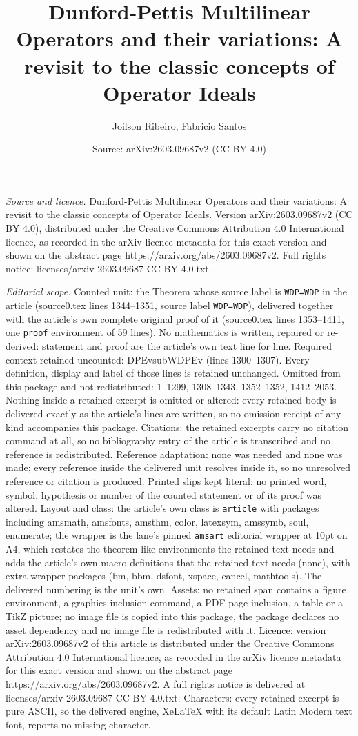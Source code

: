 \documentclass[10pt,a4paper]{amsart}
\title[Dunford-Pettis Multilinear Operators and their variations: A]{Dunford-Pettis Multilinear Operators and their variations: A revisit to the classic concepts of Operator Ideals}
\author{Joilson Ribeiro, Fabricio Santos}
\date{Source: arXiv:2603.09687v2 (CC BY 4.0)}
\begin{document}
\maketitle

\noindent\emph{Source and licence.} Dunford-Pettis Multilinear Operators and their variations: A revisit to the classic concepts of Operator Ideals. Version arXiv:2603.09687v2 (CC BY 4.0), distributed under the Creative Commons Attribution 4.0 International licence, as recorded in the arXiv licence metadata for this exact version and shown on the abstract page https://arxiv.org/abs/2603.09687v2. Full rights notice: licenses/arxiv-2603.09687-CC-BY-4.0.txt.\par\smallskip

\noindent\textit{Editorial scope.} Counted unit: the Theorem whose source label is \texttt{WDP=WDP} in the article (source0.tex lines 1344--1351, source label \texttt{WDP=WDP}), delivered together with the article's own complete original proof of it (source0.tex lines 1353--1411, one \texttt{proof} environment of 59 lines). No mathematics is written, repaired or re-derived: statement and proof are the article's own text line for line. Required context retained uncounted: DPEvsubWDPEv (lines 1300--1307). Every definition, display and label of those lines is retained unchanged. Omitted from this package and not redistributed: 1--1299, 1308--1343, 1352--1352, 1412--2053. Nothing inside a retained excerpt is omitted or altered: every retained body is delivered exactly as the article's lines are written, so no omission receipt of any kind accompanies this package. Citations: the retained excerpts carry no citation command at all, so no bibliography entry of the article is transcribed and no reference is redistributed. Reference adaptation: none was needed and none was made; every reference inside the delivered unit resolves inside it, so no unresolved reference or citation is produced. Printed slips kept literal: no printed word, symbol, hypothesis or number of the counted statement or of its proof was altered. Layout and class: the article's own class is \texttt{article} with packages including amsmath, amsfonts, amsthm, color, latexsym, amssymb, soul, enumerate; the wrapper is the lane's pinned \texttt{amsart} editorial wrapper at 10pt on A4, which restates the theorem-like environments the retained text needs and adds the article's own macro definitions that the retained text needs (none), with extra wrapper packages (bm, bbm, dsfont, xspace, cancel, mathtools). The delivered numbering is the unit's own. Assets: no retained span contains a figure environment, a graphics-inclusion command, a PDF-page inclusion, a table or a TikZ picture; no image file is copied into this package, the package declares no asset dependency and no image file is redistributed with it. Licence: version arXiv:2603.09687v2 of this article is distributed under the Creative Commons Attribution 4.0 International licence, as recorded in the arXiv licence metadata for this exact version and shown on the abstract page https://arxiv.org/abs/2603.09687v2. A full rights notice is delivered at licenses/arxiv-2603.09687-CC-BY-4.0.txt. Characters: every retained excerpt is pure ASCII, so the delivered engine, XeLaTeX with its default Latin Modern text font, reports no missing character.
\end{document}
